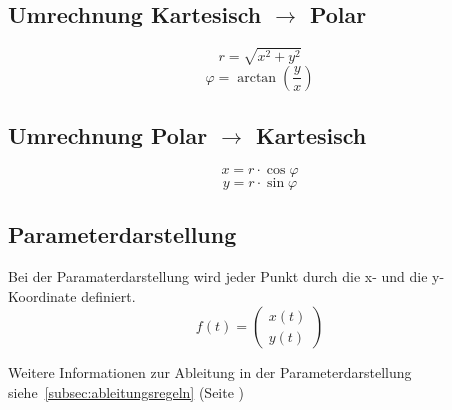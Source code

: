 \subsection{Umrechnung Kartesisch $\rightarrow$ Polar}
\[ \boxed{r = \sqrt{x^2 + y^2}} \]
\[ \boxed{\varphi = \arctan\left(\frac{y}{x}\right)} \]

\subsection{Umrechnung Polar $\rightarrow$ Kartesisch}
\[ \boxed{x = r \cdot \cos{\varphi}} \]
\[ \boxed{y = r \cdot \sin{\varphi}} \]

\subsection{Parameterdarstellung}
Bei der Paramaterdarstellung wird jeder Punkt durch die x- und die y-Koordinate definiert. 
\[ \boxed{f(t) = \left(\begin{matrix} x(t)\\ y(t) \end{matrix}\right)} \] 

\noindent 
Weitere Informationen zur Ableitung in der Parameterdarstellung siehe~\ref{subsec:ableitungsregeln} (Seite \pageref{subsec:ableitungsregeln})
